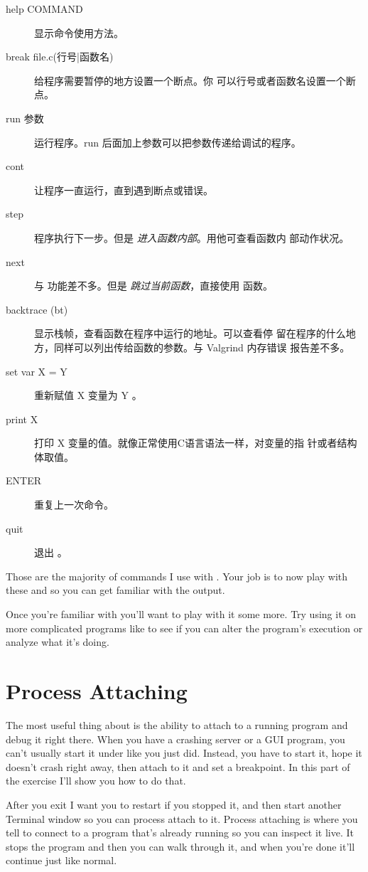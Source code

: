 \begin{enumerate}
\begin{description}
\item[help COMMAND] 显示命令使用方法。
\item[break file.c(行号|函数名)] 给程序需要暂停的地方设置一个断点。你
  可以行号或者函数名设置一个断点。
\item[run 参数] 运行程序。run 后面加上参数可以把参数传递给调试的程序。
\item[cont] 让程序一直运行，直到遇到断点或错误。
\item[step] 程序执行下一步。但是 \emph{进入函数内部}。用他可查看函数内
  部动作状况。
\item[next] 与  功能差不多。但是 \emph{跳过当前函数}，直接使用
  函数。
\item[backtrace (bt)] 显示栈帧，查看函数在程序中运行的地址。可以查看停
  留在程序的什么地方，同样可以列出传给函数的参数。与 Valgrind 内存错误
  报告差不多。
\item[set var X = Y] 重新赋值 X 变量为 Y 。
\item[print X] 打印 X 变量的值。就像正常使用C语言语法一样，对变量的指
  针或者结构体取值。
\item[ENTER] 重复上一次命令。
\item[quit] 退出 。
\end{description}




Those are the majority of commands I use with .  Your job is to
now play with these and  so you can get familiar with the output.

Once you're familiar with  you'll want to play with it some more.
Try using it on more complicated programs like  to see if you
can alter the program's execution or analyze what it's doing.


\section{Process Attaching}

The most useful thing about  is the ability to attach to a running program and
debug it right there.  When you have a crashing server or a GUI program, you can't
usually start it under  like you just did.  Instead, you have to start
it, hope it doesn't crash right away, then attach to it and set a breakpoint.  In
this part of the exercise I'll show you how to do that.

After you exit  I want you to restart  if you
stopped it, and then start another Terminal window so you can process attach to
it.  Process attaching is where you tell  to connect to a program
that's already running so you can inspect it live.  It stops the program and
then you can walk through it, and when you're done it'll continue just like
normal.


\end{enumerate}
